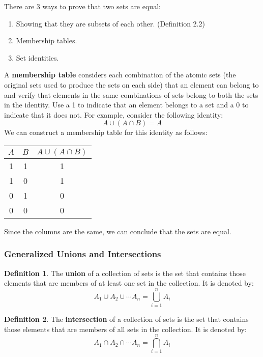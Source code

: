 \documentclass[article, 11pt]{article}
\theoremstyle{definition}
\newtheorem{definition}{Definition}[section]
\newcommand{\unite}{\cup}
\newcommand{\inter}{\cap}
\begin{document}
    There are 3 ways to prove that two sets are equal:
    \begin{enumerate}
        \item Showing that they are subsets of each other. (Definition 2.2)
        \item Membership tables.
        \item Set identities.
    \end{enumerate}
    A \textbf{membership table} considers each combination of the atomic sets (the original sets used to produce the sets on each side) that an element can belong to and verify that elements in the same combinations of sets belong to both the sets in the identity. Use a 1 to indicate that an element belongs to a set and a 0 to indicate that it does not. For example, consider the following identity:
    \begin{equation*}
        A \unite (A \inter B) = A
    \end{equation*}
    We can construct a membership table for this identity as follows:
    \begin{center}
        \begin{tabular}{|c|c|c|}
            \hline
            $A$ & $B$ & $A \unite (A \inter B)$ \\
            \hline
            1 & 1 & 1 \\
            1 & 0 & 1 \\
            0 & 1 & 0 \\
            0 & 0 & 0 \\
            \hline
        \end{tabular}
    \end{center}
    Since the columns are the same, we can conclude that the sets are equal.
    \subsubsection{Generalized Unions and Intersections}
    \begin{definition}
        The \textbf{union} of a collection of sets is the set that contains those elements that are members of at least one set in the collection. It is denoted by:
        \begin{equation*}
            A_1 \unite A_2 \unite \cdots A_n = \bigcup_{i=1}^{n} A_i
        \end{equation*}
    \end{definition}
    \begin{definition}
        The \textbf{intersection} of a collection of sets is the set that contains those elements that are members of all sets in the collection. It is denoted by:
        \begin{equation*}
            A_1 \inter A_2 \inter \cdots A_n = \bigcap_{i=1}^{n} A_i
        \end{equation*}
    \end{definition}
\end{document}
